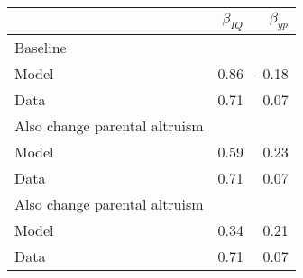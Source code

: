 \begin{tabular}{lrr}
\hline
  & $\beta_{IQ}$  & $\beta_{yp}$  \\
\hline
Baseline &   &   \\
Model & 0.86  & -0.18  \\
Data & 0.71  & 0.07  \\
Also change parental altruism &   &   \\
Model & 0.59  & 0.23  \\
Data & 0.71  & 0.07  \\
Also change parental altruism &   &   \\
Model & 0.34  & 0.21  \\
Data & 0.71  & 0.07  \\
\hline
\end{tabular}%
